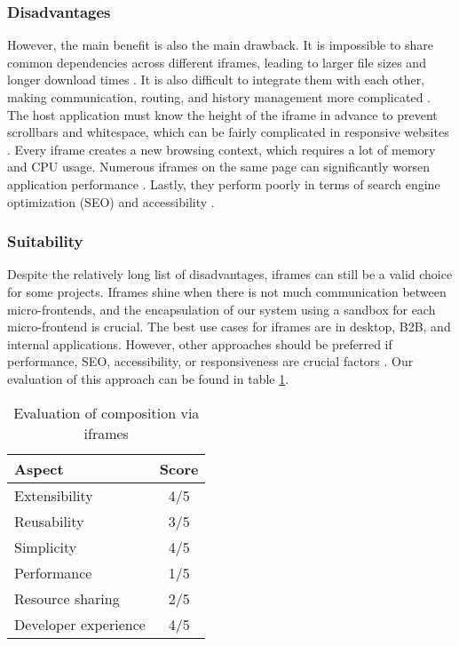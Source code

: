 \subsubsection{Disadvantages}
However, the main benefit is also the main drawback. It is impossible to share common dependencies across different iframes, leading to larger file sizes and longer download times \cite{Pavlenko}. It is also difficult to integrate them with each other, making communication, routing, and history management more complicated \cite{Jackson}. The host application must know the height of the iframe in advance to prevent scrollbars and whitespace, which can be fairly complicated in responsive websites \cite{MezzaliraBuildingMf}\cite{Geers}. Every iframe creates a new browsing context, which requires a lot of memory and CPU usage. Numerous iframes on the same page can significantly worsen application performance \cite{Geers}. Lastly, they perform poorly in terms of search engine optimization (SEO) and accessibility \cite{Geers}.

\subsubsection{Suitability}
Despite the relatively long list of disadvantages, iframes can still be a valid choice for some projects. Iframes shine when there is not much communication between micro-frontends, and the encapsulation of our system using a sandbox for each micro-frontend is crucial. The best use cases for iframes are in desktop, B2B, and internal applications. However, other approaches should be preferred if performance, SEO, accessibility, or responsiveness are crucial factors \cite{Geers}\cite{MezzaliraBuildingMf}. Our evaluation of this approach can be found in table \ref{table:iframe-evaluation}.

\begin{table}[h]
  \centering
  \begin{tabular}{|p{4cm}|c|}
    \hline
      \textbf{Aspect} & \textbf{Score} \\
    \hline
      Extensibility & 4/5 \\
    \hline
      Reusability & 3/5 \\
    \hline
      Simplicity & 4/5 \\
    \hline
      Performance & 1/5 \\
    \hline
      Resource sharing & 2/5 \\
    \hline
      Developer experience & 4/5 \\
    \hline
  \end{tabular}
  \caption{Evaluation of composition via iframes}
  \label{table:iframe-evaluation}
\end{table}


